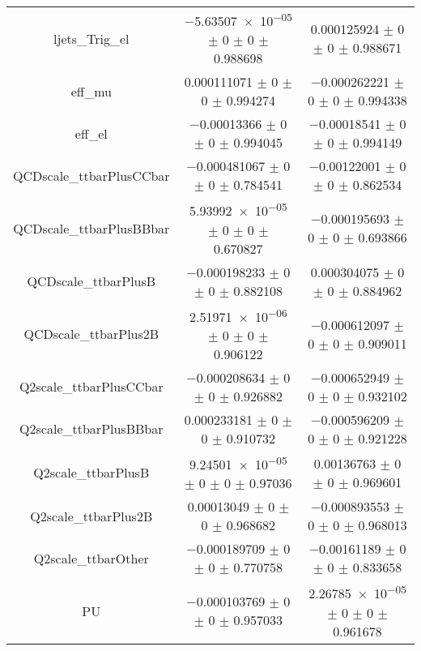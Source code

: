 \begin{table}
\begin{tabular}{ccc}
ljets\_Trig\_el 	& \num{-5.63507e-05} $\pm$ \num{0} $\pm$ \num{0} $\pm$ \num{0.988698} 	& \num{0.000125924} $\pm$ \num{0} $\pm$ \num{0} $\pm$ \num{0.988671}\\
eff\_mu 	& \num{0.000111071} $\pm$ \num{0} $\pm$ \num{0} $\pm$ \num{0.994274} 	& \num{-0.000262221} $\pm$ \num{0} $\pm$ \num{0} $\pm$ \num{0.994338}\\
eff\_el 	& \num{-0.00013366} $\pm$ \num{0} $\pm$ \num{0} $\pm$ \num{0.994045} 	& \num{-0.00018541} $\pm$ \num{0} $\pm$ \num{0} $\pm$ \num{0.994149}\\
QCDscale\_ttbarPlusCCbar 	& \num{-0.000481067} $\pm$ \num{0} $\pm$ \num{0} $\pm$ \num{0.784541} 	& \num{-0.00122001} $\pm$ \num{0} $\pm$ \num{0} $\pm$ \num{0.862534}\\
QCDscale\_ttbarPlusBBbar 	& \num{5.93992e-05} $\pm$ \num{0} $\pm$ \num{0} $\pm$ \num{0.670827} 	& \num{-0.000195693} $\pm$ \num{0} $\pm$ \num{0} $\pm$ \num{0.693866}\\
QCDscale\_ttbarPlusB 	& \num{-0.000198233} $\pm$ \num{0} $\pm$ \num{0} $\pm$ \num{0.882108} 	& \num{0.000304075} $\pm$ \num{0} $\pm$ \num{0} $\pm$ \num{0.884962}\\
QCDscale\_ttbarPlus2B 	& \num{2.51971e-06} $\pm$ \num{0} $\pm$ \num{0} $\pm$ \num{0.906122} 	& \num{-0.000612097} $\pm$ \num{0} $\pm$ \num{0} $\pm$ \num{0.909011}\\
Q2scale\_ttbarPlusCCbar 	& \num{-0.000208634} $\pm$ \num{0} $\pm$ \num{0} $\pm$ \num{0.926882} 	& \num{-0.000652949} $\pm$ \num{0} $\pm$ \num{0} $\pm$ \num{0.932102}\\
Q2scale\_ttbarPlusBBbar 	& \num{0.000233181} $\pm$ \num{0} $\pm$ \num{0} $\pm$ \num{0.910732} 	& \num{-0.000596209} $\pm$ \num{0} $\pm$ \num{0} $\pm$ \num{0.921228}\\
Q2scale\_ttbarPlusB 	& \num{9.24501e-05} $\pm$ \num{0} $\pm$ \num{0} $\pm$ \num{0.97036} 	& \num{0.00136763} $\pm$ \num{0} $\pm$ \num{0} $\pm$ \num{0.969601}\\
Q2scale\_ttbarPlus2B 	& \num{0.00013049} $\pm$ \num{0} $\pm$ \num{0} $\pm$ \num{0.968682} 	& \num{-0.000893553} $\pm$ \num{0} $\pm$ \num{0} $\pm$ \num{0.968013}\\
Q2scale\_ttbarOther 	& \num{-0.000189709} $\pm$ \num{0} $\pm$ \num{0} $\pm$ \num{0.770758} 	& \num{-0.00161189} $\pm$ \num{0} $\pm$ \num{0} $\pm$ \num{0.833658}\\
PU 	& \num{-0.000103769} $\pm$ \num{0} $\pm$ \num{0} $\pm$ \num{0.957033} 	& \num{2.26785e-05} $\pm$ \num{0} $\pm$ \num{0} $\pm$ \num{0.961678}\\

\end{tabular}
\end{table}
